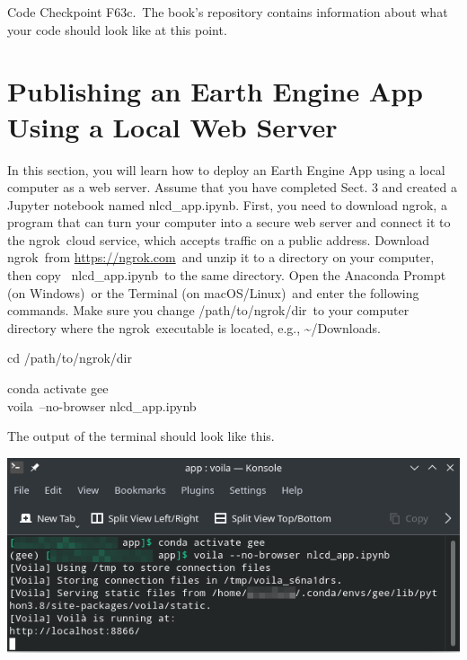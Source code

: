 \documentclass[
  letterpaper,
  DIV=11,
  numbers=noendperiod]{scrreprt}
\begin{document}
\begin{tcolorbox}[enhanced jigsaw, left=2mm, breakable, rightrule=.15mm, opacityback=0, colframe=quarto-callout-note-color-frame, colbacktitle=quarto-callout-note-color!10!white, arc=.35mm, opacitybacktitle=0.6, toptitle=1mm, colback=white, leftrule=.75mm, title=\textcolor{quarto-callout-note-color}{\faInfo}\hspace{0.5em}{Note}, toprule=.15mm, bottomtitle=1mm, titlerule=0mm, bottomrule=.15mm, coltitle=black]

Code Checkpoint F63c.~The book's repository contains information about
what your code should look like at this point.

\end{tcolorbox}

\hypertarget{publishing-an-earth-engine-app-using-a-local-web-server}{%
\section{Publishing an Earth Engine App Using a Local Web
Server}\label{publishing-an-earth-engine-app-using-a-local-web-server}}

In this section, you will learn how to deploy an Earth Engine App using
a local computer as a web server. Assume that you have completed Sect. 3
and created a Jupyter notebook named nlcd\_app.ipynb. First, you need to
download ngrok, a program that can turn your computer into a secure web
server and connect it to the ngrok~cloud service, which accepts traffic
on a public address. Download ngrok~from
\href{https://www.google.com/url?q=https://ngrok.com\&sa=D\&source=editors\&ust=1671458841326366\&usg=AOvVaw20VcUaADMd_4ptInlJt5X1}{https://ngrok.com}~and
unzip it to a directory on your computer, then copy ~nlcd\_app.ipynb~to
the same directory. Open the Anaconda Prompt (on Windows)~or the
Terminal (on macOS/Linux)~and enter the following commands. Make sure
you change /path/to/ngrok/dir~to your computer directory where the
ngrok~executable is located, e.g., \textasciitilde/Downloads. ~

cd /path/to/ngrok/dir

conda activate gee\\
voila~--no-browser nlcd\_app.ipynb

The output of the terminal should look like this.

\includegraphics{./F6/image38.png}
\end{document}
